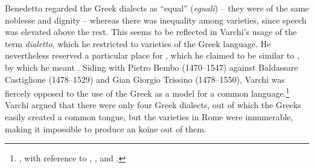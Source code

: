 Benedetto \citet[95]{Varchi1570} regarded the Greek dialects as “equal” (\textit{eguali}) – they were of the same noblesse and dignity – whereas there was inequality among  varieties, since  speech was elevated above the rest. This seems to be reflected in Varchi’s usage of the term \textit{dialetto}, which he restricted to varieties of the Greek language. He nevertheless reserved a particular place for , which he claimed to be similar to , by which he meant  \citep[141]{Varchi1570}. Siding with Pietro Bembo (1470–1547) against Baldassare Castiglione (1478–1529) and Gian Giorgio Trissino (1478–1550), Varchi was fiercely opposed to the use of the Greek  as a model for a common  language.\footnote{\citet[269--271]{Varchi1570}, with reference to \citet{Bembo1525}, \citet{Castiglione1528}, and \citet{Trissino1529}.} Varchi argued that there were only four Greek dialects, out of which the Greeks easily created a common tongue, but the varieties in Rome were innumerable, making it impossible to produce an  koine out of them.

